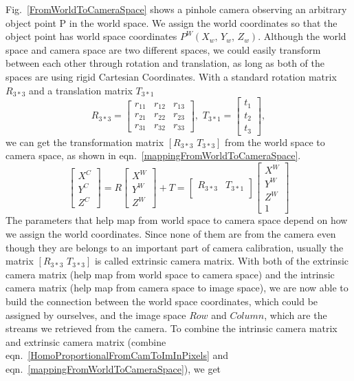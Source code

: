 Fig.~\ref{FromWorldToCameraSpace} shows a pinhole camera observing an arbitrary object point P in the world  space. We assign the world coordinates so that the object point has world space coordinates \(P^W(X_w, \, Y_w, \, Z_w)\). Although the world space and camera space are two different spaces, we could easily transform between each other through rotation and translation, as long as both of the spaces are using rigid Cartesian Coordinates. With a standard rotation matrix \(R_{3*3}\) and a translation matrix \(T_{3*1}\)
%
\begin{equation}
R_{3*3}%
=  \begin{bmatrix} 
r_{11} & r_{12} & r_{13} \\
r_{21} & r_{22} & r_{23} \\
r_{31} & r_{32} & r_{33}
 \end{bmatrix}%
, \, \, 
T_{3*1}%
=  \begin{bmatrix} 
t_{1} \\
t_{2} \\
t_{3}
 \end{bmatrix} ,%
\label{rotationTranslationMatrixRT}
\end{equation}%
%
we can get the transformation matrix \([R_{3*3} \,\, T_{3*3}]\) from the world space to camera space, as shown in eqn.~\ref{mappingFromWorldToCameraSpace}.
%
\begin{equation}
\begin{bmatrix} 
X^{C} \\
Y^{C} \\
Z^{C}
 \end{bmatrix}%
=  R \begin{bmatrix} 
X^{W} \\
Y^{W} \\
Z^{W}
 \end{bmatrix}%
 + T
=
\begin{bmatrix} 
R_{3*3} & T_{3*1} \\
\end{bmatrix}%
 \begin{bmatrix} 
X^{W} \\
Y^{W} \\
Z^{W} \\
1
 \end{bmatrix}%
\label{mappingFromWorldToCameraSpace}
\end{equation}%
%
%
%
The parameters that help map from world space to camera space depend on how we assign the world coordinates. Since none of them are from the camera even though they are belongs to an important part of camera calibration, usually the matrix \([R_{3*3} \,\, T_{3*3}]\) is called extrinsic camera matrix. With both of the extrinsic camera matrix (help map from world space to camera space) and the intrinsic camera matrix (help map from camera space to image space), we are now able to build the connection between the world space coordinates, which could be assigned by ourselves, and the image space \(Row\) and \(Column\), which are the streams we retrieved from the camera. To combine the intrinsic camera matrix and extrinsic camera matrix (combine eqn.~\ref{HomoProportionalFromCamToImInPixels} and eqn.~\ref{mappingFromWorldToCameraSpace}), we get 


